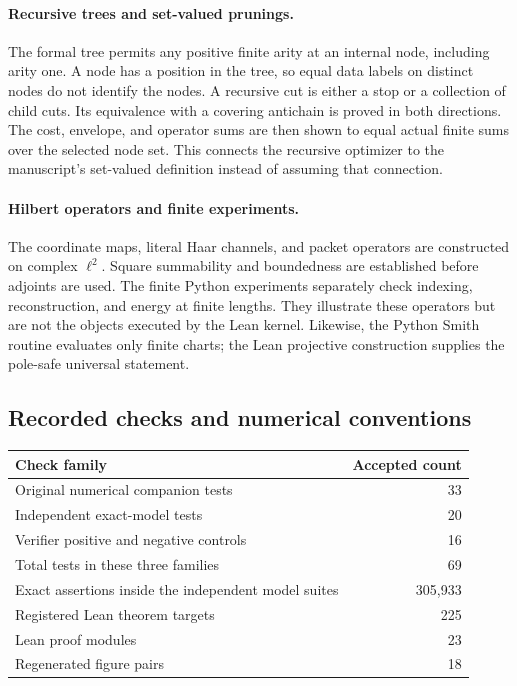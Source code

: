 \documentclass[11pt,letterpaper]{article}
\theoremstyle{plain}
\theoremstyle{plain}
\theoremstyle{plain}
\theoremstyle{definition}
\theoremstyle{definition}
\theoremstyle{definition}
\theoremstyle{definition}
\theoremstyle{remark}
\theoremstyle{remark}
\theoremstyle{remark}
\theoremstyle{remark}
\begin{document}
\paragraph{Recursive trees and set-valued prunings.}
The formal tree permits any positive finite arity at an internal node, including arity one. A node has a position in the tree, so equal data labels on distinct nodes do not identify the nodes. A recursive cut is either a stop or a collection of child cuts. Its equivalence with a covering antichain is proved in both directions. The cost, envelope, and operator sums are then shown to equal actual finite sums over the selected node set. This connects the recursive optimizer to the manuscript's set-valued definition instead of assuming that connection.

\paragraph{Hilbert operators and finite experiments.}
The coordinate maps, literal Haar channels, and packet operators are constructed on complex $\ell^2$. Square summability and boundedness are established before adjoints are used. The finite Python experiments separately check indexing, reconstruction, and energy at finite lengths. They illustrate these operators but are not the objects executed by the Lean kernel. Likewise, the Python Smith routine evaluates only finite charts; the Lean projective construction supplies the pole-safe universal statement.

\subsection{Recorded checks and numerical conventions}

\begin{center}
\begin{tabular}{lr}
\toprule
\textbf{Check family}&\textbf{Accepted count}\\
\midrule
Original numerical companion tests&33\\
Independent exact-model tests&20\\
Verifier positive and negative controls&16\\
Total tests in these three families&69\\
Exact assertions inside the independent model suites&305,933\\
Registered Lean theorem targets&225\\
Lean proof modules&23\\
Regenerated figure pairs&18\\
\bottomrule
\end{tabular}
\end{center}
\end{document}

